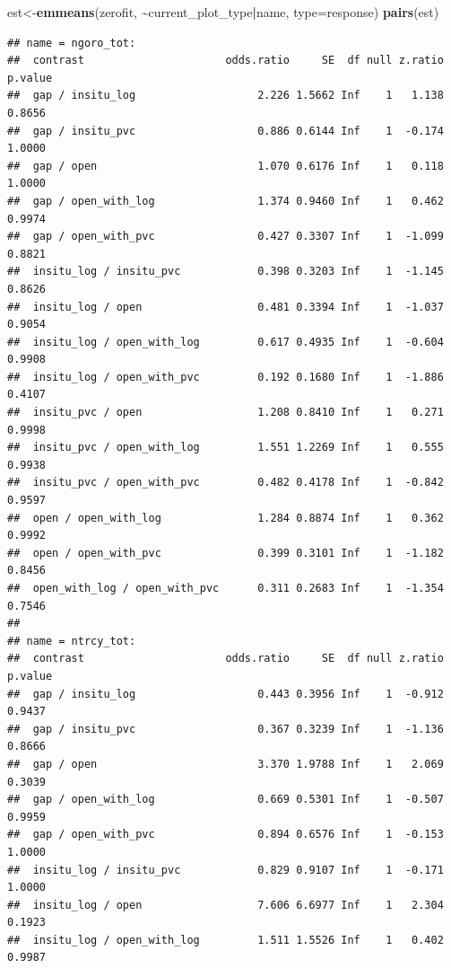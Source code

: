 \documentclass[
]{article}
\newenvironment{Shaded}{\begin{snugshade}}{\end{snugshade}}
\newcommand{\AttributeTok}[1]{\textcolor[rgb]{0.13,0.29,0.53}{#1}}
\newcommand{\FunctionTok}[1]{\textcolor[rgb]{0.13,0.29,0.53}{\textbf{#1}}}
\newcommand{\NormalTok}[1]{#1}
\newcommand{\OtherTok}[1]{\textcolor[rgb]{0.56,0.35,0.01}{#1}}
\newcommand{\SpecialCharTok}[1]{\textcolor[rgb]{0.81,0.36,0.00}{\textbf{#1}}}
\newcommand{\StringTok}[1]{\textcolor[rgb]{0.31,0.60,0.02}{#1}}
\begin{document}
\begin{Shaded}
\begin{Highlighting}[]
\NormalTok{est}\OtherTok{\textless{}{-}}\FunctionTok{emmeans}\NormalTok{(zerofit, }\SpecialCharTok{\textasciitilde{}}\NormalTok{current\_plot\_type}\SpecialCharTok{|}\NormalTok{name, }\AttributeTok{type=}\StringTok{\textquotesingle{}response\textquotesingle{}}\NormalTok{)}
\FunctionTok{pairs}\NormalTok{(est)}
\end{Highlighting}
\end{Shaded}

\begin{verbatim}
## name = ngoro_tot:
##  contrast                      odds.ratio     SE  df null z.ratio p.value
##  gap / insitu_log                   2.226 1.5662 Inf    1   1.138  0.8656
##  gap / insitu_pvc                   0.886 0.6144 Inf    1  -0.174  1.0000
##  gap / open                         1.070 0.6176 Inf    1   0.118  1.0000
##  gap / open_with_log                1.374 0.9460 Inf    1   0.462  0.9974
##  gap / open_with_pvc                0.427 0.3307 Inf    1  -1.099  0.8821
##  insitu_log / insitu_pvc            0.398 0.3203 Inf    1  -1.145  0.8626
##  insitu_log / open                  0.481 0.3394 Inf    1  -1.037  0.9054
##  insitu_log / open_with_log         0.617 0.4935 Inf    1  -0.604  0.9908
##  insitu_log / open_with_pvc         0.192 0.1680 Inf    1  -1.886  0.4107
##  insitu_pvc / open                  1.208 0.8410 Inf    1   0.271  0.9998
##  insitu_pvc / open_with_log         1.551 1.2269 Inf    1   0.555  0.9938
##  insitu_pvc / open_with_pvc         0.482 0.4178 Inf    1  -0.842  0.9597
##  open / open_with_log               1.284 0.8874 Inf    1   0.362  0.9992
##  open / open_with_pvc               0.399 0.3101 Inf    1  -1.182  0.8456
##  open_with_log / open_with_pvc      0.311 0.2683 Inf    1  -1.354  0.7546
## 
## name = ntrcy_tot:
##  contrast                      odds.ratio     SE  df null z.ratio p.value
##  gap / insitu_log                   0.443 0.3956 Inf    1  -0.912  0.9437
##  gap / insitu_pvc                   0.367 0.3239 Inf    1  -1.136  0.8666
##  gap / open                         3.370 1.9788 Inf    1   2.069  0.3039
##  gap / open_with_log                0.669 0.5301 Inf    1  -0.507  0.9959
##  gap / open_with_pvc                0.894 0.6576 Inf    1  -0.153  1.0000
##  insitu_log / insitu_pvc            0.829 0.9107 Inf    1  -0.171  1.0000
##  insitu_log / open                  7.606 6.6977 Inf    1   2.304  0.1923
##  insitu_log / open_with_log         1.511 1.5526 Inf    1   0.402  0.9987

\end{verbatim}
\end{document}

